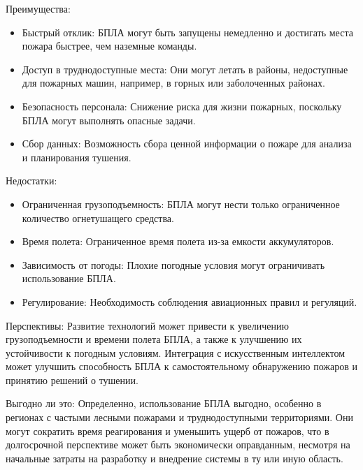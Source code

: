 Преимущества:
\begin{itemize}
	\item Быстрый отклик: БПЛА могут быть запущены немедленно и достигать места пожара быстрее, чем наземные команды.
	\item Доступ в труднодоступные места: Они могут летать в районы, недоступные для пожарных машин, например, в горных или заболоченных районах.
	\item Безопасность персонала: Снижение риска для жизни пожарных, поскольку БПЛА могут выполнять опасные задачи.
	\item Сбор данных: Возможность сбора ценной информации о пожаре для анализа и планирования тушения.
\end{itemize}
Недостатки:
\begin{itemize}
	\item Ограниченная грузоподъемность: БПЛА могут нести только ограниченное количество огнетушащего средства.
	\item Время полета: Ограниченное время полета из-за емкости аккумуляторов.
	\item Зависимость от погоды: Плохие погодные условия могут ограничивать использование БПЛА.
	\item Регулирование: Необходимость соблюдения авиационных правил и регуляций.
\end{itemize}

Перспективы:
Развитие технологий может привести к увеличению грузоподъемности и времени полета БПЛА, а также к улучшению их устойчивости к погодным условиям. Интеграция с искусственным интеллектом может улучшить способность БПЛА к самостоятельному обнаружению пожаров и принятию решений о тушении.

Выгодно ли это:
Определенно, использование БПЛА выгодно, особенно в регионах с частыми лесными пожарами и труднодоступными территориями. Они могут сократить время реагирования и уменьшить ущерб от пожаров, что в долгосрочной перспективе может быть экономически оправданным, несмотря на начальные затраты на разработку и внедрение системы в ту или иную область.
